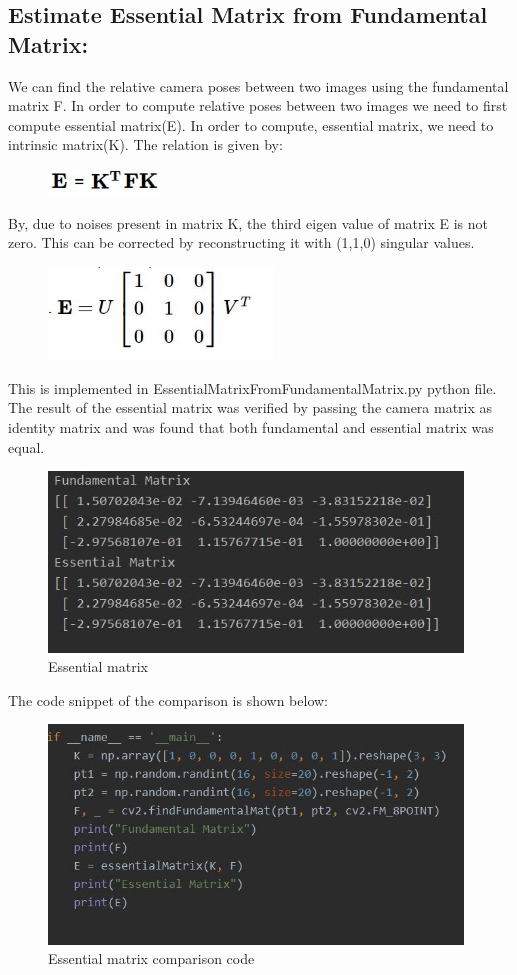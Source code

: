 \documentclass[12pt]{article}
\begin{document}
\subsection{Estimate Essential Matrix from Fundamental Matrix:}
We can find the relative camera poses between two images using the fundamental matrix F. In order to compute relative poses between two images we need to first compute essential matrix(E). In order to compute, essential matrix, we need to intrinsic matrix(K). The relation is given by:
\begin{figure}[h]
    \centering
    \includegraphics[width=3cm]{EM}
\end{figure}
\newline
By, due to noises present in matrix K, the third eigen value of matrix E is not zero. This can be corrected by reconstructing it with (1,1,0) singular values.
\newpage
\begin{figure}[h]
    \centering
    \includegraphics[width=6cm]{EM2}
\end{figure}
This is implemented in EssentialMatrixFromFundamentalMatrix.py python file. The result of the essential matrix was verified by passing the camera matrix as identity matrix and was found that both fundamental and essential matrix was equal.
\begin{figure}[h]
    \centering
    \includegraphics[width=11cm]{essmat}
    \caption{Essential matrix}
    \label{fig:Essential matrix}
\end{figure}
\newline
The code snippet of the comparison is shown below:
\begin{figure}[h]
    \centering
    \includegraphics[width=11cm]{esscode}
    \caption{Essential matrix comparison code}
    \label{fig:Essential matrix comparison code}
\end{figure}
\end{document}
